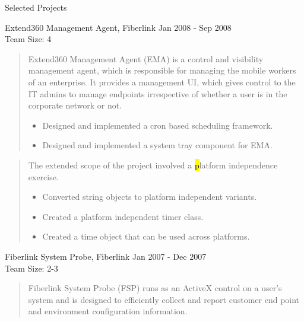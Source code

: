 \documentclass{resume}
\newcommand{\teamsize}{\\\sc\footnotesize Team Size: }
\begin{document}
\begin{category}{Selected Projects}{}

    \item {\topic Extend360 Management Agent,} Fiberlink
        {\period Jan 2008 - Sep 2008}
        {\teamsize 4}
        \begin{quote}
            Extend360 Management Agent (EMA) is a control and visibility
            management agent, which is responsible for managing the mobile
            workers of an enterprise. It provides a management UI, which gives
            control to the IT admins to manage endpoints irrespective of
            whether a user is in the corporate network or not.

            \begin{itemize}
                \item Designed and implemented a cron based scheduling framework.
                \item Designed and implemented a system tray component for EMA.
            \end{itemize}
        \end{quote}
        \begin{quote}
            The extended scope of the project involved a {\hl platform independence}
            exercise.

            \begin{itemize}
                \item Converted string objects to platform independent
                    variants.
                \item Created a platform independent timer class.
                \item Created a time object that can be used across platforms.
            \end{itemize}
        \end{quote}

    \item {\topic Fiberlink System Probe,} Fiberlink
        {\period Jan 2007 - Dec 2007}
        {\teamsize 2-3}
        \begin{quote}
            Fiberlink System Probe (FSP) runs as an ActiveX control on a user's system
            and is designed to efficiently collect and report customer end
            point and environment configuration information.


\end{quote}
\end{category}
\end{document}

